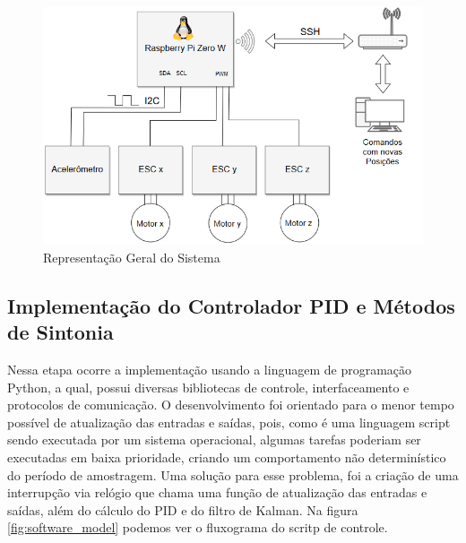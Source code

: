 \begin{figure}[H]
  \caption{Representação Geral do Sistema}
  \begin{center}
      \includegraphics[scale=.65]{metodologia/img/comunicacao_projeto}
  \end{center}
  \label{fig:comunicacao_projeto}
\end{figure}



\subsection{Implementação do Controlador PID e Métodos de Sintonia}

Nessa etapa ocorre a implementação usando a linguagem de programação Python, a qual, possui diversas bibliotecas de controle, interfaceamento e protocolos de comunicação. O desenvolvimento foi orientado para o menor tempo possível de atualização das entradas e saídas, pois, como é uma linguagem script sendo executada por um sistema operacional, algumas tarefas poderiam ser executadas em baixa prioridade, criando um comportamento não determinístico do período de amostragem. Uma solução para esse problema, foi a criação de uma interrupção via relógio que chama uma função de atualização das entradas e saídas, além do cálculo do PID e do filtro de Kalman. Na figura \ref{fig:software_model} podemos ver o fluxograma do scritp de controle.

